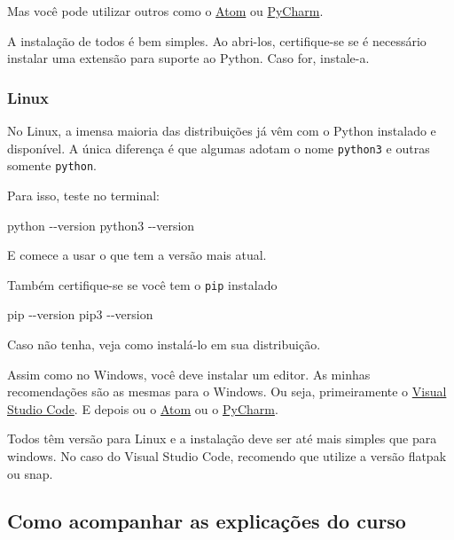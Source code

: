 \documentclass[11pt, brazilian]{article}
\newenvironment{Shaded}{}{}
\newcommand{\ExtensionTok}[1]{{#1}}
\newcommand{\AttributeTok}[1]{\textcolor[rgb]{0.49,0.56,0.16}{{#1}}}
\begin{document}
Mas você pode utilizar outros como o \href{https://atom.io/}{Atom} ou
\href{https://www.jetbrains.com/pt-br/pycharm/download/}{PyCharm}.

A instalação de todos é bem simples. Ao abri-los, certifique-se se é
necessário instalar uma extensão para suporte ao Python. Caso for,
instale-a.

\hypertarget{linux-1}{%
\subsubsection{Linux}\label{linux-1}}

No Linux, a imensa maioria das distribuições já vêm com o Python
instalado e disponível. A única diferença é que algumas adotam o nome
\texttt{python3} e outras somente \texttt{python}.

Para isso, teste no terminal:

\begin{Shaded}
\begin{Highlighting}[]
\ExtensionTok{python} \AttributeTok{{-}{-}version}
\ExtensionTok{python3} \AttributeTok{{-}{-}version}
\end{Highlighting}
\end{Shaded}

E comece a usar o que tem a versão mais atual.

Também certifique-se se você tem o \texttt{pip} instalado

\begin{Shaded}
\begin{Highlighting}[]
\ExtensionTok{pip} \AttributeTok{{-}{-}version}
\ExtensionTok{pip3} \AttributeTok{{-}{-}version}
\end{Highlighting}
\end{Shaded}

Caso não tenha, veja como instalá-lo em sua distribuição.

Assim como no Windows, você deve instalar um editor. As minhas
recomendações são as mesmas para o Windows. Ou seja, primeiramente o
\href{https://code.visualstudio.com/}{Visual Studio Code}. E depois ou o
\href{https://atom.io/}{Atom} ou o
\href{https://www.jetbrains.com/pt-br/pycharm/download/}{PyCharm}.

Todos têm versão para Linux e a instalação deve ser até mais simples que
para windows. No caso do Visual Studio Code, recomendo que utilize a
versão flatpak ou snap.

\hypertarget{como-acompanhar-as-explicauxe7uxf5es-do-curso}{%
\subsection{Como acompanhar as explicações do
curso}\label{como-acompanhar-as-explicauxe7uxf5es-do-curso}}
\end{document}
